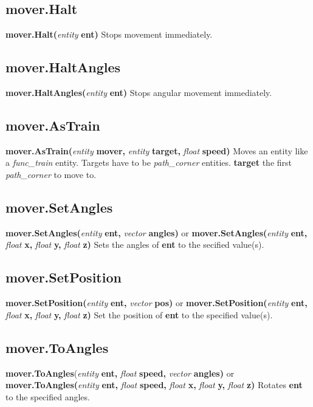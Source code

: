 \documentclass{scrreprt}
\begin{document}
\subsection{mover.Halt}
\label{mver-halt}
\textbf{mover.Halt(}\textit{entity}\textbf{ ent)}
\newline
Stops movement immediately.
\subsection{mover.HaltAngles}
\label{mver-haltangles}
\textbf{mover.HaltAngles(}\textit{entity}\textbf{ ent)}
\newline
Stops angular movement immediately.
\subsection{mover.AsTrain}
\label{mver-astrain}
\textbf{mover.AsTrain(}\textit{entity}\textbf{ mover, }\textit{entity}\textbf{ target, }\textit{float}\textbf{ speed)}
\newline
Moves an entity like a \textit{func\_train} entity. Targets have to be \textit{path\_corner} entities.
\newline
\textbf{target} the first \textit{path\_corner} to move to.
\subsection{mover.SetAngles}
\label{mver-setangles}
\textbf{mover.SetAngles(}\textit{entity}\textbf{ ent, }\textit{vector}\textbf{ angles)} or \textbf{mover.SetAngles(}\textit{entity}\textbf{ ent, }\textit{float}\textbf{ x, }\textit{float}\textbf{ y, }\textit{float}\textbf{ z)}
\newline
Sets the angles of \textbf{ent} to the secified value(s).
\subsection{mover.SetPosition}
\label{mver-setposition}
\textbf{mover.SetPosition(}\textit{entity}\textbf{ ent, }\textit{vector}\textbf{ pos)} or \textbf{mover.SetPosition(}\textit{entity}\textbf{ ent, }\textit{float}\textbf{ x, }\textit{float}\textbf{ y, }\textit{float}\textbf{ z)}
\newline
Set the position of \textbf{ent} to the specified value(s).
\subsection{mover.ToAngles}
\label{mver-toangles}
\textbf{mover.ToAngles}(\textit{entity}\textbf{ ent, }\textit{float}\textbf{ speed, }\textit{vector}\textbf{ angles)} or \textbf{mover.ToAngles(}\textit{entity}\textbf{ ent, }\textit{float}\textbf{ speed, }\textit{float}\textbf{ x, }\textit{float}\textbf{ y, }\textit{float}\textbf{ z)}
\newline
Rotates \textbf{ent} to the specified angles.
\end{document}
